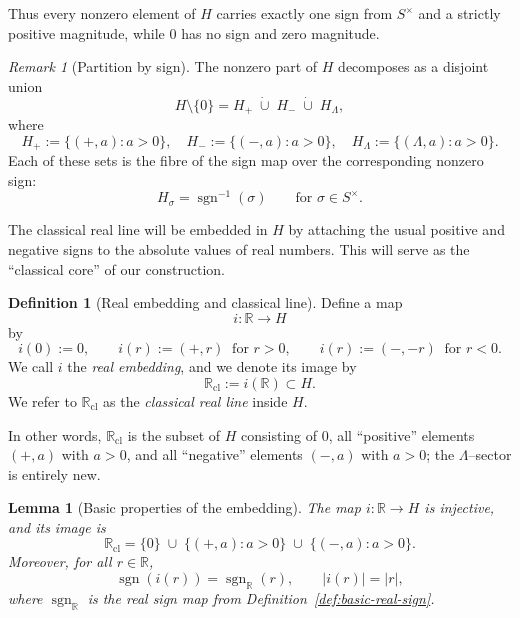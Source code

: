 \documentclass[11pt]{amsart}
\numberwithin{equation}{section}
\newtheorem{lemma}[theorem]{Lemma}
\theoremstyle{definition}
\newtheorem{definition}[theorem]{Definition}
\theoremstyle{remark}
\newtheorem{remark}[theorem]{Remark}
\newcommand{\R}{\mathbb{R}}
\newcommand{\Rc}{\mathbb{R}_{\mathrm{cl}}} %
\newcommand{\Hnum}{H}                      %
\newcommand{\Snon}{S^{\times}}             %
\newcommand{\sgn}{\operatorname{sgn}}
\newcommand{\iemb}{i}                      %
\begin{document}
Thus every nonzero element of $\Hnum$ carries exactly one sign from
$\Snon$ and a strictly positive magnitude, while $0$ has no sign and
zero magnitude.

\begin{remark}[Partition by sign]\label{rem:sign-partition}
The nonzero part of $\Hnum$ decomposes as a disjoint union
\[
  \Hnum\setminus\{0\}
  = H_+ \;\dot\cup\; H_- \;\dot\cup\; H_\Lambda,
\]
where
\[
  H_+ := \{(+,a): a>0\},\quad
  H_- := \{(-,a): a>0\},\quad
  H_\Lambda := \{(\Lambda,a): a>0\}.
\]
Each of these sets is the fibre of the sign map over the corresponding
nonzero sign:
\[
  H_\sigma = \sgn^{-1}(\sigma)
  \qquad\text{for }\sigma\in\Snon.
\]
\end{remark}

The classical real line will be embedded in $\Hnum$ by attaching the
usual positive and negative signs to the absolute values of real
numbers.  This will serve as the ``classical core'' of our construction.

\begin{definition}[Real embedding and classical line]\label{def:real-embedding}
Define a map
\[
  \iemb : \R \longrightarrow \Hnum
\]
by
\[
  \iemb(0) := 0,\qquad
  \iemb(r) := ( +, r ) \ \text{ for } r>0,\qquad
  \iemb(r) := ( -, -r ) \ \text{ for } r<0.
\]
We call $\iemb$ the \emph{real embedding}, and we denote its image by
\[
  \Rc := \iemb(\R) \subset \Hnum.
\]
We refer to $\Rc$ as the \emph{classical real line} inside $\Hnum$.
\end{definition}

In other words, $\Rc$ is the subset of $\Hnum$ consisting of $0$, all
``positive'' elements $(+,a)$ with $a>0$, and all ``negative'' elements
$(-,a)$ with $a>0$; the $\Lambda$--sector is entirely new.

\begin{lemma}[Basic properties of the embedding]\label{lem:embedding-basic}
The map $\iemb:\R\to\Hnum$ is injective, and its image is
\[
  \Rc = \{0\}\;\cup\;\{(+,a): a>0\}\;\cup\;\{(-,a): a>0\}.
\]
Moreover, for all $r\in\R$,
\[
  \sgn(\iemb(r)) = \operatorname{sgn}_\R(r),\qquad
  |\iemb(r)| = |r|,
\]
where $\operatorname{sgn}_\R$ is the real sign map from
Definition~\ref{def:basic-real-sign}.
\end{lemma}
\end{document}
